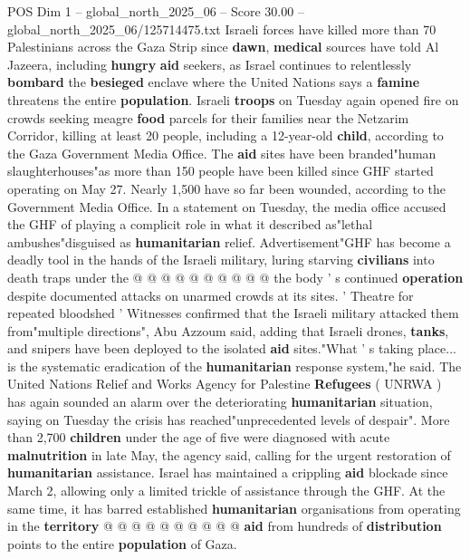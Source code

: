 \begin{textsample}{POS Dim 1 – global\_north\_2025\_06 – Score 30.00 – global\_north\_2025\_06/125714475.txt}  \label{ex:f1_pos_310}
Israeli forces have killed more than 70 Palestinians across the Gaza Strip since \textbf{dawn}, \textbf{medical} sources have told Al Jazeera, including \textbf{hungry} \textbf{aid} seekers, as Israel continues to relentlessly \textbf{bombard} the \textbf{besieged} enclave where the United Nations says a \textbf{famine} threatens the entire \textbf{population}.
Israeli \textbf{troops} on Tuesday again opened fire on crowds seeking meagre \textbf{food} parcels for their families near the Netzarim Corridor, killing at least 20 people, including a 12-year-old \textbf{child}, according to the Gaza Government Media Office.
The \textbf{aid} sites have been branded"human slaughterhouses"as more than 150 people have been killed since GHF started operating on May 27.
Nearly 1,500 have so far been wounded, according to the Government Media Office.
In a statement on Tuesday, the media office accused the GHF of playing a complicit role in what it described as"lethal ambushes"disguised as \textbf{humanitarian} relief.
Advertisement"GHF has become a deadly tool in the hands of the Israeli military, luring starving \textbf{civilians} into death traps under the @ @ @ @ @ @ @ @ @ @ the body ' s continued \textbf{operation} despite documented attacks on unarmed crowds at its sites. ' Theatre for repeated bloodshed ' Witnesses confirmed that the Israeli military attacked them from"multiple directions", Abu Azzoum said, adding that Israeli drones, \textbf{tanks}, and snipers have been deployed to the isolated \textbf{aid} sites."What ' s taking place... is the systematic eradication of the \textbf{humanitarian} response system,"he said.
The United Nations Relief and Works Agency for Palestine \textbf{Refugees} ( UNRWA ) has again sounded an alarm over the deteriorating \textbf{humanitarian} situation, saying on Tuesday the crisis has reached"unprecedented levels of despair".
More than 2,700 \textbf{children} under the age of five were diagnosed with acute \textbf{malnutrition} in late May, the agency said, calling for the urgent restoration of \textbf{humanitarian} assistance.
Israel has maintained a crippling \textbf{aid} blockade since March 2, allowing only a limited trickle of assistance through the GHF.
At the same time, it has barred established \textbf{humanitarian} organisations from operating in the \textbf{territory} @ @ @ @ @ @ @ @ @ @ \textbf{aid} from hundreds of \textbf{distribution} points to the entire \textbf{population} of Gaza.

\end{textsample}
